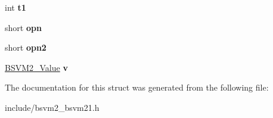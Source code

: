 \begin{DoxyCompactItemize}
\item 
\hypertarget{structBSVM2__TailOpcode__s_a13401dfe34442acc448b3f94540203d5}{int {\bfseries t1}}\label{structBSVM2__TailOpcode__s_a13401dfe34442acc448b3f94540203d5}

\item 
\hypertarget{structBSVM2__TailOpcode__s_a47e6ecd5899a320c5dd82f6794677c23}{short {\bfseries opn}}\label{structBSVM2__TailOpcode__s_a47e6ecd5899a320c5dd82f6794677c23}

\item 
\hypertarget{structBSVM2__TailOpcode__s_a3809273a37d3d8d79b53ceca63a437c5}{short {\bfseries opn2}}\label{structBSVM2__TailOpcode__s_a3809273a37d3d8d79b53ceca63a437c5}

\item 
\hypertarget{structBSVM2__TailOpcode__s_af6ca748bda4e024db76e876b8bb1853e}{\hyperlink{unionBSVM2__Value__u}{B\-S\-V\-M2\-\_\-\-Value} {\bfseries v}}\label{structBSVM2__TailOpcode__s_af6ca748bda4e024db76e876b8bb1853e}

\end{DoxyCompactItemize}


The documentation for this struct was generated from the following file\-:\begin{DoxyCompactItemize}
\item 
include/bsvm2\-\_\-bsvm21.\-h\end{DoxyCompactItemize}
